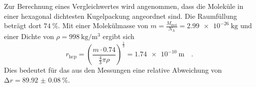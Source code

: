 \noindent
Zur Berechnung eines Vergleichwertes wird angenommen, dass die Moleküle in einer hexagonal dichtesten Kugelpackung angeordnet 
sind. Die Raumfüllung beträgt dort $\SI{74}{\percent}$. Mit einer Molekülmasse von $m = \frac{M_\text{mol}}{N_\text{A}} = \SI{2.99e-26}{\kilo\gram}$
und einer Dichte von $\rho=\SI{998}{\kilo\gram\per\metre^3}$\cite{visko} ergibt sich
\begin{equation*}
  r_\text{hcp} = \left(\frac{m\cdot 0.74}{\frac{4}{3}\pi\rho}\right)^{\frac{1}{3}} = \SI{1.74e-10}{\metre} \quad .
\end{equation*}
Dies bedeutet für das aus den Messungen eine relative Abweichung von $\increment r = \SI{89.92(8)}{\percent}$.

